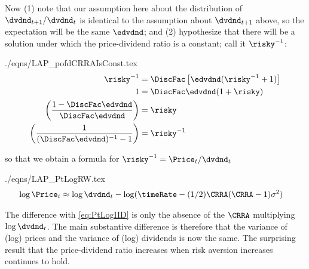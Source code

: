 \documentclass{handout}
\begin{document}
Now (1) note that our assumption here about the distribution of $\dvdnd_{t+1}/\dvdnd_{t}$ is identical to the assumption about $\dvdnd_{t+1}$ above, so the expectation will be the same $\edvdnd$; and (2) hypothesize that there will be a solution under which the price-dividend ratio is a constant; call it $\risky^{-1}$:  
\begin{verbatimwrite}{./eqns/LAP_pofdCRRAIsConst.tex}
\begin{equation}\begin{gathered}\begin{aligned}
\risky^{-1}  & =   \DiscFac  \left[\edvdnd(\risky^{-1}+1)\right] 
\\ 1 & =  \DiscFac \edvdnd (1+\risky)
\\ \left(\frac{1-\DiscFac \edvdnd}{\DiscFac \edvdnd}\right)  & =  \risky
\\ \left(\frac{1}{(\DiscFac \edvdnd)^{-1}-1}\right)  & =  \risky^{-1}
\end{aligned}\end{gathered}\end{equation}
\end{verbatimwrite}

so that we obtain a formula for $\risky^{-1} = \Price_{t}/\dvdnd_{t}$
\begin{verbatimwrite}{./eqns/LAP_PtLogRW.tex}
\begin{equation}\begin{gathered}\begin{aligned}
  \log \Price_{t} & \approx  \log \dvdnd_{t}  - \log (\timeRate -  (1/2)\CRRA (\CRRA-1) \sigma^{2})\label{eq:PtLogRW}
\end{aligned}\end{gathered}\end{equation}
\end{verbatimwrite}


The difference with \eqref{eq:PtLogIID} is only the absence of the $\CRRA$ multiplying $\log \dvdnd_{t}$.  The main substantive difference is therefore that the variance of (log) prices and the variance of (log) dividends is now the same.  The surprising result that the price-dividend ratio increases when risk aversion increases continues to hold.
\end{document}
